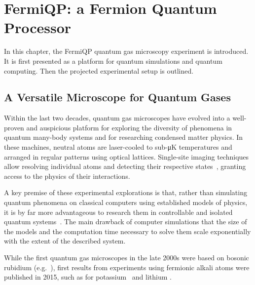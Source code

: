 \renewcommand{\imagepath}{../20-fermiqp/img}

\chapter{FermiQP: a Fermion Quantum Processor}
In this chapter, the FermiQP quantum gas microscopy experiment is introduced. It is first presented as a platform for quantum simulations and quantum computing. Then the projected experimental setup is outlined.

\section{A Versatile Microscope for Quantum Gases}\label{ch:quantum_gas_microscopy}
Within the last two decades, quantum gas microscopes have evolved into a well-proven and auspicious platform for exploring the diversity of phenomena in quantum many-body systems and for researching condensed matter physics. In these machines, neutral atoms are laser-cooled to sub-\si[]{\micro\kelvin} temperatures and arranged in regular patterns using optical lattices. Single-site imaging techniques allow resolving individual atoms and detecting their respective states~\cite{bloch_many-body_2008,gross_quantum_2017, gross_quantum_2021}, granting access to the physics of their interactions.

A key premise of these experimental explorations is that, rather than simulating quantum phenomena on classical computers using established models of physics, it is by far more advantageous to research them in controllable and isolated quantum systems~\cite{feynman_simulating_1982}. The main drawback of computer simulations that the size of the models and the computation time necessary to solve them scale exponentially with the extent of the described system.

While the first quantum gas microscopes in the late 2000s were based on bosonic rubidium (e.g.~\cite{sherson_single-atom-resolved_2010}), first results from experiments using fermionic alkali atoms were published in 2015, such as for potassium~\cite{cheuk_quantum-gas_2015} and lithium \cite{parsons_site-resolved_2015, omran_microscopic_2015}.

